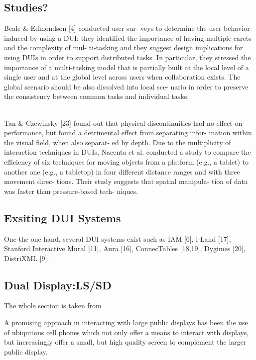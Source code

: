 \subsection{Studies?}
\cite{vanderdonckt2010distributed} Beale & Edmondson [4] conducted user sur-
veys to determine the user behavior induced by using a DUI: they identified the
importance of having multiple carets and the complexity of mul- ti-tasking and
they suggest design implications for using DUIs in order to support distributed
tasks. In particular, they stressed the importance of a multi-tasking model that is partially built at the local level of a single user and at the global level across users when collaboration exists. The global scenario should be also dissolved into local sce- nario in order to preserve the consistency between common tasks and individual tasks.\\\
 
\cite{vanderdonckt2010distributed} Tan & Czewinsky [23] found out that physical
discontinuities had no effect on performance, but found a detrimental effect from separating infor- mation within the visual field, when also separat- ed by depth. Due to the multiplicity of interaction techniques in DUIs, Nacenta et al. conducted a study to compare the efficiency of six techniques for moving objects from a platform (e.g., a tablet) to another one (e.g., a tabletop) in four different distance ranges and with three movement direc- tions. Their study suggests that spatial manipula- tion of data was faster than pressure-based tech- niques.\\

\subsection{Exsiting DUI Systems}
\cite{demeure20084c} One the one hand, several DUI systems exist such as IAM
[6], i-Land [17], Stanford Interactive Mural [11], Aura [16], ConnecTables [18,19], Dygimes [20], DistriXML [9].

\subsection{Dual Display:LS/SD}
The whole section is taken from \cite{kaviani2011dual}

A promising approach in interacting with large public displays has been the use
of ubiquitous cell phones which not only offer a means to interact with
displays, but increasingly offer a small, but high quality screen to complement
the larger public display.\\

